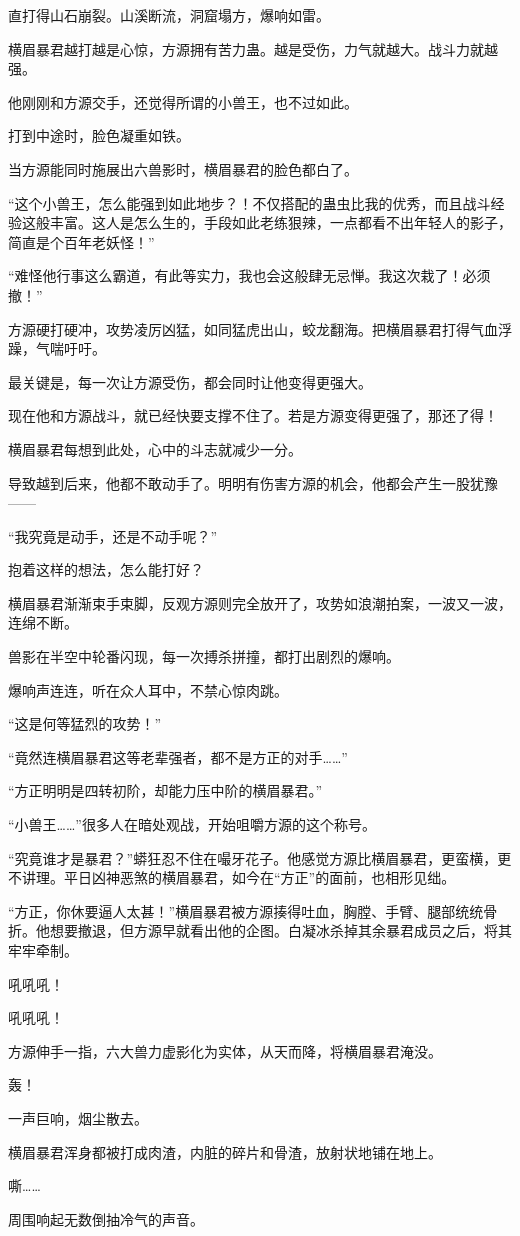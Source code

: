 \begin{this_body}
直打得山石崩裂。山溪断流，洞窟塌方，爆响如雷。

横眉暴君越打越是心惊，方源拥有苦力蛊。越是受伤，力气就越大。战斗力就越强。

他刚刚和方源交手，还觉得所谓的小兽王，也不过如此。

打到中途时，脸色凝重如铁。

当方源能同时施展出六兽影时，横眉暴君的脸色都白了。

“这个小兽王，怎么能强到如此地步？！不仅搭配的蛊虫比我的优秀，而且战斗经验这般丰富。这人是怎么生的，手段如此老练狠辣，一点都看不出年轻人的影子，简直是个百年老妖怪！”

“难怪他行事这么霸道，有此等实力，我也会这般肆无忌惮。我这次栽了！必须撤！”

方源硬打硬冲，攻势凌厉凶猛，如同猛虎出山，蛟龙翻海。把横眉暴君打得气血浮躁，气喘吁吁。

最关键是，每一次让方源受伤，都会同时让他变得更强大。

现在他和方源战斗，就已经快要支撑不住了。若是方源变得更强了，那还了得！

横眉暴君每想到此处，心中的斗志就减少一分。

导致越到后来，他都不敢动手了。明明有伤害方源的机会，他都会产生一股犹豫——

“我究竟是动手，还是不动手呢？”

抱着这样的想法，怎么能打好？

横眉暴君渐渐束手束脚，反观方源则完全放开了，攻势如浪潮拍案，一波又一波，连绵不断。

兽影在半空中轮番闪现，每一次搏杀拼撞，都打出剧烈的爆响。

爆响声连连，听在众人耳中，不禁心惊肉跳。

“这是何等猛烈的攻势！”

“竟然连横眉暴君这等老辈强者，都不是方正的对手……”

“方正明明是四转初阶，却能力压中阶的横眉暴君。”

“小兽王……”很多人在暗处观战，开始咀嚼方源的这个称号。

“究竟谁才是暴君？”蟒狂忍不住在嘬牙花子。他感觉方源比横眉暴君，更蛮横，更不讲理。平日凶神恶煞的横眉暴君，如今在“方正”的面前，也相形见绌。

“方正，你休要逼人太甚！”横眉暴君被方源揍得吐血，胸膛、手臂、腿部统统骨折。他想要撤退，但方源早就看出他的企图。白凝冰杀掉其余暴君成员之后，将其牢牢牵制。

吼吼吼！

吼吼吼！

方源伸手一指，六大兽力虚影化为实体，从天而降，将横眉暴君淹没。

轰！

一声巨响，烟尘散去。

横眉暴君浑身都被打成肉渣，内脏的碎片和骨渣，放射状地铺在地上。

嘶……

周围响起无数倒抽冷气的声音。

\end{this_body}

